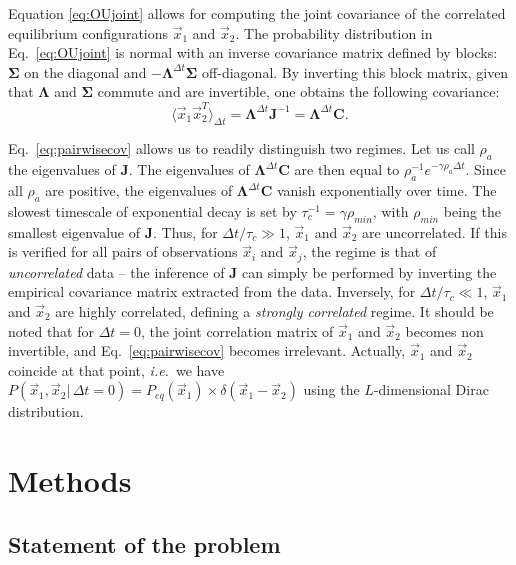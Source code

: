 \documentclass[preprint,amsmath,amssymb,superscriptaddress,showpacs,pre]{revtex4-1}
\newcommand{\ie}{\emph{i.e.}}
\def\vx{\vec x}
\newcommand{\Lam}{\bm{\Lambda}}
\newcommand{\Sig}{\bm{\Sigma}}
\begin{document}
Equation \eqref{eq:OUjoint} allows for computing the joint covariance of the correlated equilibrium configurations $\vx_1$ and $\vx_2$. 
The probability distribution in Eq.~\eqref{eq:OUjoint} is normal with an inverse covariance matrix defined by blocks: $\Sig$ on the diagonal and $-\Lam^{\Delta t}\Sig$ off-diagonal. 
By inverting this block matrix, given that $\Lam$ and $\Sig$ commute and are invertible, one obtains the following covariance: 
\begin{equation}
	\langle \vx_1\vx_2^T \rangle_{\Delta t} = \Lam^{\Delta t}\bm{J}^{-1} = \Lam^{\Delta t}\bm{C}. 
	\label{eq:pairwisecov}
\end{equation}


Eq.~\eqref{eq:pairwisecov} allows us to readily distinguish two regimes. 
Let us call $\rho_a$ the eigenvalues of $\bm{J}$. 
The eigenvalues of $\Lam^{\Delta t}\bm{C}$ are then equal to $\rho_a^{-1}e^{-\gamma\rho_a\Delta t}$. 
Since all $\rho_a$ are positive, the eigenvalues of $\Lam^{\Delta t}\bm{C}$ vanish exponentially over time. The slowest timescale of exponential decay is set by $\tau_c^{-1} = \gamma\rho_{min}$, with $\rho_{min}$ being the smallest eigenvalue of $\bm{J}$. 
Thus, for $\Delta t / \tau_c \gg 1$, $\vx_1$ and $\vx_2$ are uncorrelated. 
If this is verified for all pairs of observations $\vx_i$ and $\vx_j$, the regime is that of \emph{uncorrelated} data -- the inference of $\bm{J}$ can simply be performed by inverting the empirical covariance matrix extracted from the data. 
Inversely, for $\Delta t / \tau_c \ll 1$, $\vx_1$ and $\vx_2$ are highly correlated, defining a \emph{strongly correlated} regime. 
It should be noted that for $\Delta t = 0$, the joint correlation matrix of $\vx_1$ and $\vx_2$ becomes non invertible, and Eq.~\eqref{eq:pairwisecov} becomes irrelevant. Actually, $\vx_1$ and $\vx_2$ coincide at that point, \ie~we have $P(\vx_1,\vx_2|\,\Delta t=0) = P_{eq}(\vx_1) \times \delta(\vx_1 - \vx_2)$ using the $L$-dimensional Dirac distribution.






\section{Methods}
\label{sec:methods}

\subsection{Statement of the problem}
\label{sub:statement_of_the_problem}
\end{document}
